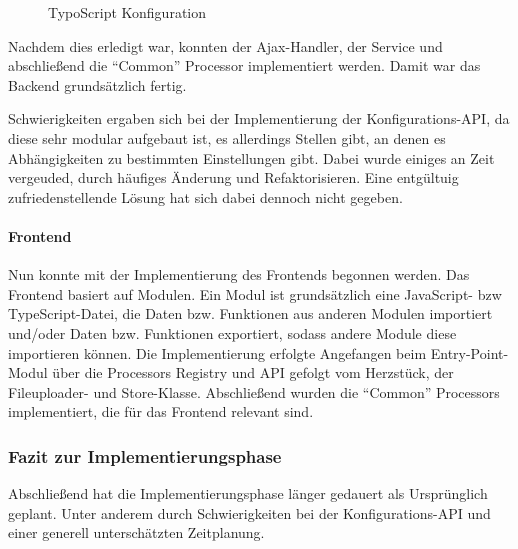 \begin{figure}[htb]
\centering
\caption{TypoScript Konfiguration}
\label{fig:typoscript}
\end{figure}

Nachdem dies erledigt war, konnten der Ajax-Handler, der Service und abschließend die ``Common'' Processor implementiert werden. Damit war das Backend grundsätzlich fertig.

Schwierigkeiten ergaben sich bei der Implementierung der Konfigurations-API, da diese sehr modular aufgebaut ist, es allerdings Stellen gibt, an denen es Abhängigkeiten zu bestimmten Einstellungen gibt. Dabei wurde einiges an Zeit vergeuded, durch häufiges Änderung und Refaktorisieren. Eine entgültuig zufriedenstellende Lösung hat sich dabei dennoch nicht gegeben.

\paragraph{Frontend} Nun konnte mit der Implementierung des Frontends begonnen werden. Das Frontend basiert auf Modulen. Ein Modul ist grundsätzlich eine JavaScript- bzw TypeScript-Datei, die Daten bzw. Funktionen aus anderen Modulen importiert und/oder Daten bzw. Funktionen exportiert, sodass andere Module diese importieren können. Die Implementierung erfolgte Angefangen beim Entry-Point-Modul über die Processors Registry und API gefolgt vom Herzstück, der Fileuploader- und  Store-Klasse. Abschließend wurden die ``Common'' Processors implementiert, die für das Frontend relevant sind.

\subsubsection{Fazit zur Implementierungsphase}
\label{sec:FazitImplementierung}

Abschließend hat die Implementierungsphase länger gedauert als Ursprünglich geplant. Unter anderem durch Schwierigkeiten bei der Konfigurations-API und einer generell unterschätzten Zeitplanung.
